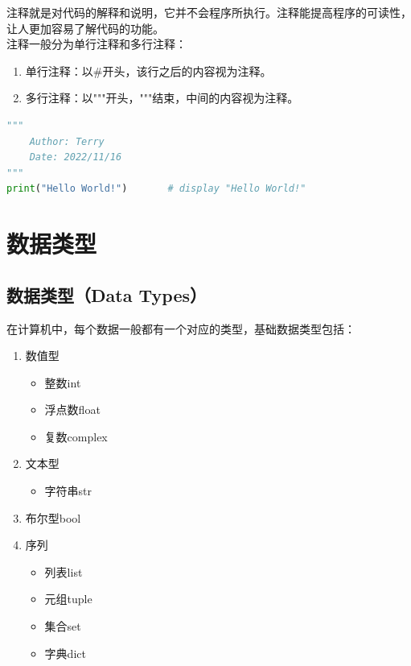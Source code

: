 注释就是对代码的解释和说明，它并不会程序所执行。注释能提高程序的可读性，让人更加容易了解代码的功能。\\

注释一般分为单行注释和多行注释：

\begin{enumerate}
	\item 单行注释：以\#开头，该行之后的内容视为注释。
	\item 多行注释：以"""开头，"""结束，中间的内容视为注释。
\end{enumerate}

\vspace{0.5cm}


\begin{lstlisting}[language=Python]
"""
    Author: Terry
    Date: 2022/11/16
"""
print("Hello World!")       # display "Hello World!"
\end{lstlisting}

\newpage

\section{数据类型}

\subsection{数据类型（Data Types）}

在计算机中，每个数据一般都有一个对应的类型，基础数据类型包括：

\begin{enumerate}
	\item 数值型
	      \begin{itemize}
		      \item 整数int
		      \item 浮点数float
		      \item 复数complex
	      \end{itemize}

	\item 文本型
	      \begin{itemize}
		      \item 字符串str
	      \end{itemize}

	\item 布尔型bool

	\item 序列
	      \begin{itemize}
		      \item 列表list
		      \item 元组tuple
		      \item 集合set
		      \item 字典dict
	      \end{itemize}
\end{enumerate}


